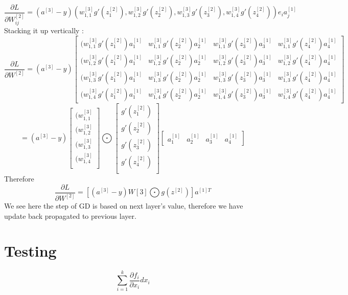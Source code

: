 \documentclass{article}
\begin{document}
\[
\frac{\partial L }{\partial W_{ij}^{[2]}} =  (a^{[3]}-y) (w_{1,1}^{[3]} g'(z_1^{[2]}),w_{1,2}^{[3]} g'(z_2^{[2]}),w_{1,3}^{[3]} g'(z_3^{[2]}),w_{1,4}^{[3]}g'(z_4^{[2]}))e_i a_j^{[1]} 
\]
Stacking it up vertically : 
\[
\frac{\partial L }{\partial W^{[2]}} =  (a^{[3]}-y) 
\begin{bmatrix}
(w_{1,1}^{[3]} g'(z_1^{[2]})a_1^{[1]} & w_{1,1}^{[3]} g'(z_2^{[2]})a_2^{[1]} & w_{1,1}^{[3]} g'(z_3^{[2]})a_3^{[1]} & w_{1,1}^{[3]}g'(z_4^{[2]})a_4^{[1]} \\
 (w_{1,2}^{[3]} g'(z_1^{[2]})a_1^{[1]} & w_{1,2}^{[3]} g'(z_2^{[2]})a_2^{[1]} & w_{1,2}^{[3]} g'(z_3^{[2]})a_3^{[1]} & w_{1,2}^{[3]}g'(z_4^{[2]})a_4^{[1]} \\
 (w_{1,3}^{[3]} g'(z_1^{[2]})a_1^{[1]} & w_{1,3}^{[3]} g'(z_2^{[2]})a_2^{[1]} & w_{1,3}^{[3]} g'(z_3^{[2]})a_3^{[1]} & w_{1,3}^{[3]}g'(z_4^{[2]})a_4^{[1]} \\
 (w_{1,4}^{[3]} g'(z_1^{[2]})a_1^{[1]} & w_{1,4}^{[3]} g'(z_2^{[2]})a_2^{[1]} & w_{1,4}^{[3]} g'(z_3^{[2]})a_3^{[1]} & w_{1,4}^{[3]}g'(z_4^{[2]})a_4^{[1]} 
\end{bmatrix} 
\]
 \[
 =  (a^{[3]}-y) 
\begin{bmatrix}
(w_{1,1}^{[3]} \\
(w_{1,2}^{[3]} \\
(w_{1,3}^{[3]} \\
(w_{1,4}^{[3]} \\
\end{bmatrix} 
\bigodot
\begin{bmatrix}
g'(z_1^{[2]}) \\
g'(z_2^{[2]})\\
g'(z_3^{[2]}) \\
g'(z_4^{[2]}) \\
\end{bmatrix} 
\begin{bmatrix}
a_1^{[1]} & a_2^{[1]} & a_3^{[1]} & a_4^{[1]} 
\end{bmatrix} 
\]
Therefore
\[
\frac{\partial L }{\partial W^{[2]}} = [ (a^{[3]}-y)W[3] \bigodot g(z^{[2]}) ] a^{[1]T} 
\]
We see here the step of GD is based on next layer's value, therefore we have update back propagated to previous layer.
\section{Testing}
\[
\sum_{i=1}^k \frac{\partial f_i}{\partial x_i} dx_i
\]
\end{document}
